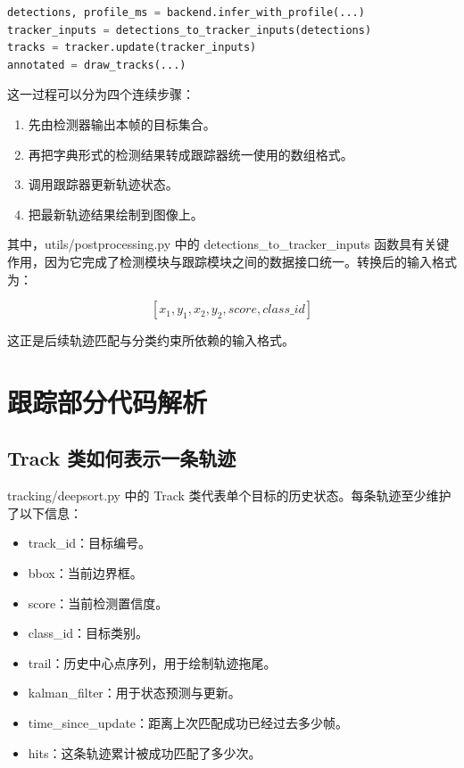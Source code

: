 \begin{lstlisting}[language=Python]
detections, profile_ms = backend.infer_with_profile(...)
tracker_inputs = detections_to_tracker_inputs(detections)
tracks = tracker.update(tracker_inputs)
annotated = draw_tracks(...)
\end{lstlisting}

这一过程可以分为四个连续步骤：

\begin{enumerate}
\def\labelenumi{\arabic{enumi}.}
\tightlist
\item
  先由检测器输出本帧的目标集合。
\item
  再把字典形式的检测结果转成跟踪器统一使用的数组格式。
\item
  调用跟踪器更新轨迹状态。
\item
  把最新轨迹结果绘制到图像上。
\end{enumerate}

其中，utils/postprocessing.py 中的 detections\_to\_tracker\_inputs
函数具有关键作用，因为它完成了检测模块与跟踪模块之间的数据接口统一。转换后的输入格式为：

\[
[x_1, y_1, x_2, y_2, score, class\_id]
\]

这正是后续轨迹匹配与分类约束所依赖的输入格式。

\section{跟踪部分代码解析}\label{src-experiment-case2-h40}

\subsection{Track 类如何表示一条轨迹}\label{src-experiment-case2-h41}

tracking/deepsort.py 中的 Track
类代表单个目标的历史状态。每条轨迹至少维护了以下信息：

\begin{itemize}
\tightlist
\item
  track\_id：目标编号。
\item
  bbox：当前边界框。
\item
  score：当前检测置信度。
\item
  class\_id：目标类别。
\item
  trail：历史中心点序列，用于绘制轨迹拖尾。
\item
  kalman\_filter：用于状态预测与更新。
\item
  time\_since\_update：距离上次匹配成功已经过去多少帧。
\item
  hits：这条轨迹累计被成功匹配了多少次。
\end{itemize}


